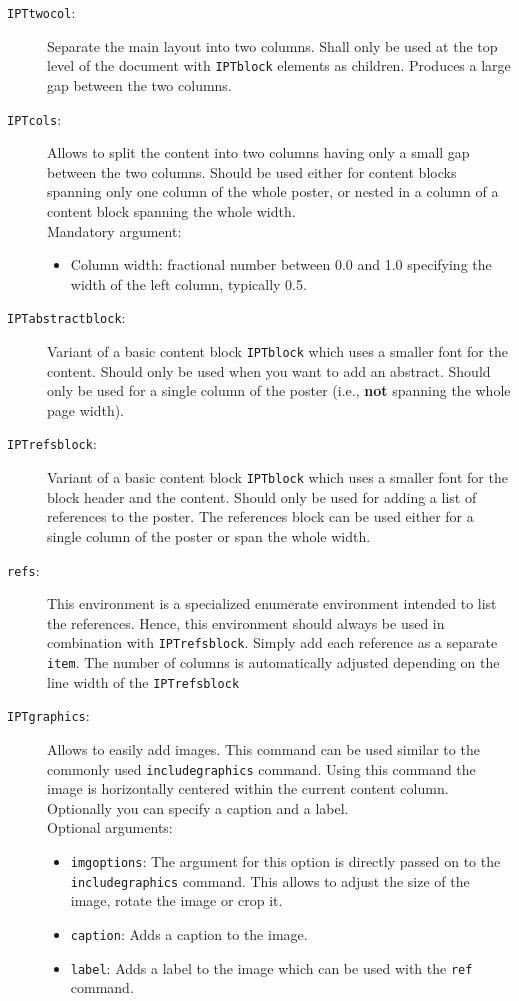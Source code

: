 \begin{description}
	\item[\texttt{IPTtwocol}:] Separate the main layout into two columns. Shall only be used at the top level of the document with \texttt{IPTblock} elements as children. Produces a large gap between the two columns.

	\item[\texttt{IPTcols}:] Allows to split the content into two columns having only a small gap between the two columns. Should be used either for content blocks spanning only one column of the whole poster, or nested in a column of a content block spanning the whole width.\\
	Mandatory argument:
		\begin{itemize}
			\item Column width: fractional number between 0.0 and 1.0 specifying the width of the left column, typically 0.5.
		\end{itemize}

	\item[\texttt{IPTabstractblock}:] Variant of a basic content block \texttt{IPTblock} which uses a smaller font for the content. Should only be used when you want to add an abstract. Should only be used for a single column of the poster (i.e., \textbf{not} spanning the whole page width).

	\item[\texttt{IPTrefsblock}:] Variant of a basic content block \texttt{IPTblock} which uses a smaller font for the block header and the content. Should only be used for adding a list of references to the poster. The references block can be used either for a single column of the poster or span the whole width.


	\item[\texttt{refs}:] This environment is a specialized enumerate environment intended to list the references. Hence, this environment should always be used in combination with \texttt{IPTrefsblock}. Simply add each reference as a separate \texttt{\bs{}item}. The number of columns is automatically adjusted depending on the line width of the \texttt{\bs{}IPTrefsblock}\\

	\item[\texttt{\bs{}IPTgraphics}:] Allows to easily add images. This command can be used similar to the commonly used \texttt{includegraphics} command. Using this command the image is horizontally centered within the current content column. Optionally you can specify a caption and a label.\\
	Optional arguments:
	\begin{itemize}
		\item \texttt{imgoptions}: The argument for this option is directly passed on to the \texttt{includegraphics} command. This allows to adjust the size of the image, rotate the image or crop it.
		\item \texttt{caption}: Adds a caption to the image.
		\item \texttt{label}: Adds a label to the image which can be used with the \texttt{ref} command.
	\end{itemize}


\end{description}
